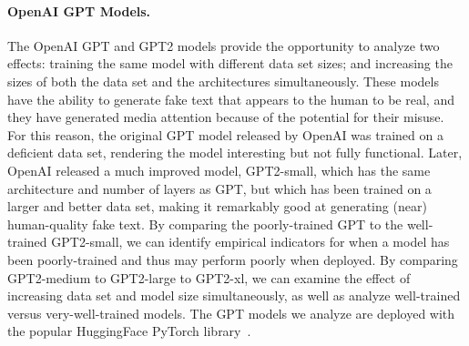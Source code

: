 \paragraph{OpenAI GPT Models.}

The OpenAI GPT and GPT2 models provide the opportunity to analyze two effects: training the same model with different data set sizes; and increasing the sizes of both the data set and the architectures simultaneously.
These models have the ability to generate fake text that appears to the human to be real, and they have generated media attention because of the potential for their misuse.
For this reason, the original GPT model released by OpenAI was trained on a deficient data set, rendering the model interesting but not fully functional.  
Later, OpenAI released a much improved model, GPT2-small, which has the same architecture and number of layers as GPT, but which has been trained on a larger and better data set, making it remarkably good at generating (near) human-quality fake text.  
By comparing the poorly-trained GPT to the well-trained GPT2-small, we can identify empirical indicators for when a model has been poorly-trained and thus may perform poorly when deployed.
By comparing GPT2-medium to GPT2-large to GPT2-xl, we can examine the effect of increasing data set and model size simultaneously, as well as analyze well-trained versus very-well-trained models.
The GPT models we analyze are deployed with the popular HuggingFace PyTorch library~\cite{huggingface}.


